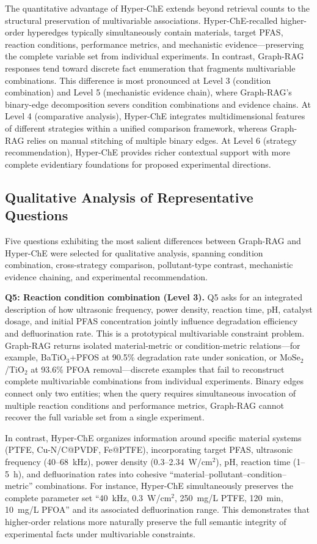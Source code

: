 \documentclass[11pt,a4paper]{article}
\begin{document}
The quantitative advantage of Hyper-ChE extends beyond retrieval counts to the structural preservation of multivariable associations. Hyper-ChE-recalled higher-order hyperedges typically simultaneously contain materials, target PFAS, reaction conditions, performance metrics, and mechanistic evidence---preserving the complete variable set from individual experiments. In contrast, Graph-RAG responses tend toward discrete fact enumeration that fragments multivariable combinations. This difference is most pronounced at Level 3 (condition combination) and Level 5 (mechanistic evidence chain), where Graph-RAG's binary-edge decomposition severs condition combinations and evidence chains. At Level 4 (comparative analysis), Hyper-ChE integrates multidimensional features of different strategies within a unified comparison framework, whereas Graph-RAG relies on manual stitching of multiple binary edges. At Level 6 (strategy recommendation), Hyper-ChE provides richer contextual support with more complete evidentiary foundations for proposed experimental directions.

\subsection{Qualitative Analysis of Representative Questions}

Five questions exhibiting the most salient differences between Graph-RAG and Hyper-ChE were selected for qualitative analysis, spanning condition combination, cross-strategy comparison, pollutant-type contrast, mechanistic evidence chaining, and experimental recommendation.

\textbf{Q5: Reaction condition combination (Level 3).} Q5 asks for an integrated description of how ultrasonic frequency, power density, reaction time, pH, catalyst dosage, and initial PFAS concentration jointly influence degradation efficiency and defluorination rate. This is a prototypical multivariable constraint problem. Graph-RAG returns isolated material-metric or condition-metric relations---for example, BaTiO$_3$+PFOS at 90.5\% degradation rate under sonication, or MoSe$_2$/TiO$_2$ at 93.6\% PFOA removal---discrete examples that fail to reconstruct complete multivariable combinations from individual experiments. Binary edges connect only two entities; when the query requires simultaneous invocation of multiple reaction conditions and performance metrics, Graph-RAG cannot recover the full variable set from a single experiment.

In contrast, Hyper-ChE organizes information around specific material systems (PTFE, Cu-N/C@PVDF, Fe@PTFE), incorporating target PFAS, ultrasonic frequency (40--68~kHz), power density (0.3--2.34~W/cm$^2$), pH, reaction time (1--5~h), and defluorination rates into cohesive ``material--pollutant--condition--metric'' combinations. For instance, Hyper-ChE simultaneously preserves the complete parameter set ``40~kHz, 0.3~W/cm$^2$, 250~mg/L PTFE, 120~min, 10~mg/L PFOA'' and its associated defluorination range. This demonstrates that higher-order relations more naturally preserve the full semantic integrity of experimental facts under multivariable constraints.
\end{document}
